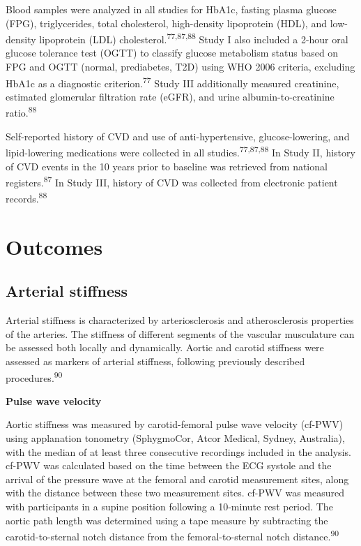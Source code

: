 \documentclass[
  letterpaper,
  headsepline=true,
  open=any]{scrbook}
\begin{document}
Blood samples were analyzed in all studies for HbA1c, fasting plasma
glucose (FPG), triglycerides, total cholesterol, high-density
lipoprotein (HDL), and low-density lipoprotein (LDL)
cholesterol.\textsuperscript{77,87,88} Study I also included a 2-hour
oral glucose tolerance test (OGTT) to classify glucose metabolism status
based on FPG and OGTT (normal, prediabetes, T2D) using WHO 2006
criteria, excluding HbA1c as a diagnostic criterion.\textsuperscript{77}
Study III additionally measured creatinine, estimated glomerular
filtration rate (eGFR), and urine albumin-to-creatinine
ratio.\textsuperscript{88}

Self-reported history of CVD and use of anti-hypertensive,
glucose-lowering, and lipid-lowering medications were collected in all
studies.\textsuperscript{77,87,88} In Study II, history of CVD events in
the 10 years prior to baseline was retrieved from national
registers.\textsuperscript{87} In Study III, history of CVD was
collected from electronic patient records.\textsuperscript{88}

\hypertarget{outcomes}{%
\section{Outcomes}\label{outcomes}}

\hypertarget{arterial-stiffness}{%
\subsection{Arterial stiffness}\label{arterial-stiffness}}

Arterial stiffness is characterized by arteriosclerosis and
atherosclerosis properties of the arteries. The stiffness of different
segments of the vascular musculature can be assessed both locally and
dynamically. Aortic and carotid stiffness were assessed as markers of
arterial stiffness, following previously described
procedures.\textsuperscript{90}

\textbf{Pulse wave velocity}

Aortic stiffness was measured by carotid-femoral pulse wave velocity
(cf-PWV) using applanation tonometry (SphygmoCor, Atcor Medical, Sydney,
Australia), with the median of at least three consecutive recordings
included in the analysis. cf-PWV was calculated based on the time
between the ECG systole and the arrival of the pressure wave at the
femoral and carotid measurement sites, along with the distance between
these two measurement sites. cf-PWV was measured with participants in a
supine position following a 10-minute rest period. The aortic path
length was determined using a tape measure by subtracting the
carotid-to-sternal notch distance from the femoral-to-sternal notch
distance.\textsuperscript{90}
\end{document}
